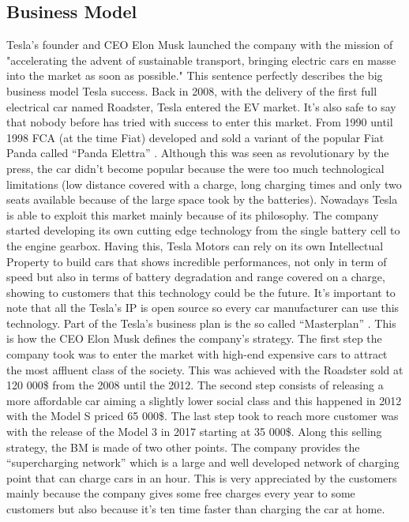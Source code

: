 \subsection{Business Model}
Tesla's founder and CEO Elon Musk launched the company with the mission of "accelerating the advent of sustainable transport, bringing electric cars en masse into the market as soon as possible." This sentence perfectly describes the big business model Tesla success.
Back in 2008, with the delivery of the first full electrical car named Roadster, Tesla entered the EV market. It’s also safe to say that nobody before has tried with success to enter this market. From 1990 until 1998 FCA (at the time Fiat) developed and sold a variant of the popular Fiat Panda called “Panda Elettra” \cite{PandaElettra}. Although this was seen as revolutionary by the press, the car didn’t become popular because the were too much technological limitations (low distance covered with a charge, long charging times and only two seats available because of the large space took by the batteries).
Nowadays Tesla is able to exploit this market mainly because of its philosophy. The company started developing its own cutting edge technology from the single battery cell to the engine gearbox. Having this, Tesla Motors can rely on its own Intellectual Property to build cars that shows incredible performances, not only in term of speed but also in terms of battery degradation and range covered on a charge, showing to customers that this technology could be the future. It’s important to note that all the Tesla’s IP is open source so every car manufacturer can use this technology.
Part of the Tesla’s business plan is the so called “Masterplan” \cite{TeslaMasterplan}. This is how the CEO Elon Musk defines the company’s strategy. The first step the company took was to enter the market with high-end expensive cars to attract the most affluent class of the society. This was achieved with the Roadster sold at 120 000\$ from the 2008 until the 2012. The second step consists of releasing a more affordable car aiming a slightly lower social class and this happened in 2012 with the Model S priced 65 000\$. The last step took to reach more customer was with the release of the Model 3 in 2017 starting at 35 000\$.
Along this selling strategy, the BM is made of two other points.
The company provides the “supercharging network” which is a large and well developed network of charging point that can charge cars in an hour. This is very appreciated by the customers mainly because the company gives some free charges every year to some customers but also because it’s ten time faster than charging the car at home.
